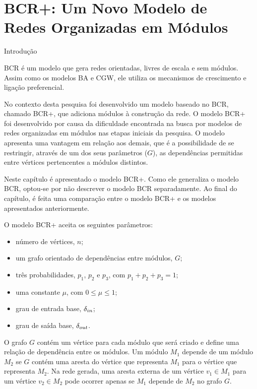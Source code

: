 \chapter{BCR+: Um Novo Modelo de Redes Organizadas em Módulos} \label{cap:bcr}

\begin{section}{Introdução}

BCR é um modelo que gera redes orientadas, livres de escala e sem módulos. Assim como os modelos BA e CGW, ele utiliza os mecanismos de crescimento e ligação preferencial.

No contexto desta pesquisa foi desenvolvido um modelo baseado no BCR, chamado BCR+, que adiciona módulos à construção da rede. O modelo BCR+ foi desenvolvido por causa da dificuldade encontrada na busca por modelos de redes organizadas em módulos nas etapas iniciais da pesquisa. O modelo apresenta uma vantagem em relação aos demais, que é a possibilidade de se restringir, através de um dos seus parâmetros ($G$), as dependências permitidas entre vértices pertencentes a módulos distintos.

Neste capítulo é apresentado o modelo BCR+. Como ele generaliza o modelo BCR, optou-se por não descrever o modelo BCR separadamente. Ao final do capítulo, é feita uma comparação entre o modelo BCR+ e os modelos apresentados anteriormente.

% 
	O modelo BCR+ aceita os seguintes parâmetros:

	\begin{itemize}
	\item número de vértices, $n$;
	\item um grafo orientado de dependências entre módulos, $G$;
	\item três probabilidades, $p_1$, $p_2$ e $p_3$, com $p_1 + p_2 + p_3 = 1$;
	\item uma constante $\mu$, com $0 \le \mu \le 1$;
	\item grau de entrada base, $\delta_{in}$;
	\item grau de saída base, $\delta_{out}$.
	\end{itemize}

	O grafo $G$ contém um vértice para cada módulo que será criado e define uma relação de dependência entre os módulos. Um módulo $M_1$ depende de um módulo $M_2$ se $G$ contém uma aresta do vértice que representa $M_1$ para o vértice que representa $M_2$. Na rede gerada, uma aresta externa de um vértice $v_1 \in M_1$ para um vértice $v_2 \in M_2$ pode ocorrer apenas se $M_1$ depende de $M_2$ no grafo $G$. %


\end{section}
